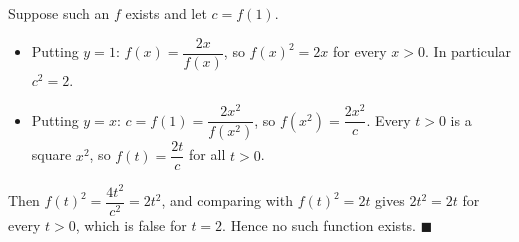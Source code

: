 Suppose such an $f$ exists and let $c=f(1)$.
\begin{itemize}
\item Putting $y=1$: $f(x)=\dfrac{2x}{f(x)}$, so $f(x)^2=2x$ for every $x>0$. In particular $c^2=2$.
\item Putting $y=x$: $c=f(1)=\dfrac{2x^2}{f(x^2)}$, so $f(x^2)=\dfrac{2x^2}{c}$. Every $t>0$ is a square $x^2$, so $f(t)=\dfrac{2t}{c}$ for all $t>0$.
\end{itemize}
Then $f(t)^2=\dfrac{4t^2}{c^2}=2t^2$, and comparing with $f(t)^2=2t$ gives $2t^2=2t$ for every $t>0$, which is false for $t=2$. Hence no such function exists. $\blacksquare$
